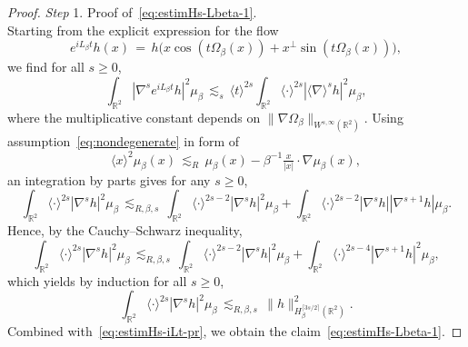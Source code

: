 \documentclass[a4paper,11pt,reqno,noindent]{amsart}
\theoremstyle{plain}
\numberwithin{equation}{section}
\newcommand{\R}{\mathbb R}
\newcommand{\3}{|\!|\!|}
\newcommand{\step}[1]{\noindent \textit{Step} #1.}
\begin{document}
\begin{proof}
\medskip\noindent
\step1 Proof of~\eqref{eq:estimHs-Lbeta-1}.\\
Starting from the explicit expression for the flow
\[e^{iL_\beta t}h(x)\,=\,h\big(x\cos(t\Omega_\beta(x))+x^\bot\sin(t\Omega_\beta(x))\big),\]
we find for all $s\ge0$,
\begin{equation}\label{eq:estimHs-iLt-pr}
\int_{\R^2} |\nabla^s e^{iL_\beta t}h|^2\mu_\beta\,\lesssim_{s}\,\langle t\rangle^{2s}\int_{\R^2}\langle\cdot\rangle^{2s}|\langle\nabla\rangle^s h|^2\mu_\beta,
\end{equation}
where the multiplicative constant depends on $\|\nabla\Omega_\beta\|_{W^{s,\infty}(\R^2)}$.
Using assumption~\eqref{eq:nondegenerate} in form of
\[\langle x\rangle^2\mu_\beta(x)\,\lesssim_R\,\mu_\beta(x)-\beta^{-1}\tfrac{x}{|x|}\cdot\nabla\mu_\beta(x),\]
an integration by parts gives for any $s\ge0$,
\[\int_{\R^2}\langle\cdot\rangle^{2s}|\nabla^s h|^2\mu_\beta\,\lesssim_{R,\beta,s}\,\int_{\R^2}\langle\cdot\rangle^{2s-2}|\nabla^s h|^2\mu_\beta
+\int_{\R^2}\langle\cdot\rangle^{2s-2}|\nabla^s h||\nabla^{s+1} h|\mu_\beta.\]
Hence, by the Cauchy--Schwarz inequality,
\[\int_{\R^2}\langle\cdot\rangle^{2s}|\nabla^s h|^2\mu_\beta\,\lesssim_{R,\beta,s}\,\int_{\R^2}\langle\cdot\rangle^{2s-2}|\nabla^s h|^2\mu_\beta
+\int_{\R^2}\langle\cdot\rangle^{2s-4}|\nabla^{s+1} h|^2\mu_\beta,\]
which yields by induction for all $s\ge0$,
\[\int_{\R^2}\langle\cdot\rangle^{2s}|\nabla^s h|^2\mu_\beta\,\lesssim_{R,\beta,s}\,\|h\|_{H^{\lceil3s/2\rceil}_\beta(\R^2)}^2.\]
Combined with~\eqref{eq:estimHs-iLt-pr}, we obtain the claim~\eqref{eq:estimHs-Lbeta-1}.


\end{proof}
\end{document}
